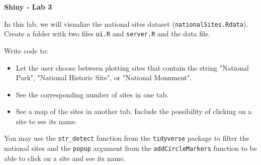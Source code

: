 \documentclass[letterpaper, 12pt]{article}
\begin{document}
\begin{center}
\textbf{\Large{Shiny - Lab 3}}
\end{center}

\vspace{2em}

In this lab, we will visualize the national sites dataset (\verb|nationalSites.Rdata|). Create a folder with two files \verb|ui.R| and \verb|server.R| and the data file.

\vspace{1em}

Write code to:
\begin{itemize}
	\item Let the user choose between plotting sites that contain the string "National Park", "National Historic Site", or "National Monument".
	\item See the corresponding number of sites in one tab.
	\item See a map of the sites in another tab. Include the possibility of clicking on a site to see its name.
\end{itemize}

\vspace{1em}

You may use the \verb|str_detect| function from the \verb|tidyverse| package to filter the national sites and the \verb|popup| argument from the \verb|addCircleMarkers| function to be able to click on a site and see its name.
 
\end{document}
